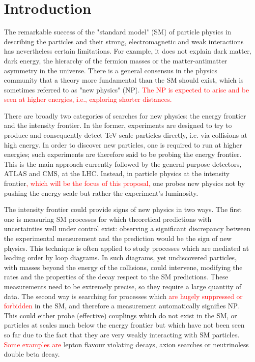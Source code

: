 
\section{Introduction}

The remarkable success of the "standard model" (SM) of particle physics in describing the particles and their strong, electromagnetic and weak interactions has nevertheless certain limitations. For example, it does not explain dark matter, dark energy, the hierarchy of the fermion masses or the matter-antimatter asymmetry in the universe. There is a general consensus in the physics community that a theory more fundamental than the SM should exist, which is sometimes referred to as "new physics" (NP). \textcolor{red}{The NP is expected to arise and be seen at higher energies, i.e., exploring shorter distances.} 

There are broadly two categories of searches for new physics: the energy frontier and the intensity frontier.  In the former, experiments are designed to try to produce and consequently detect TeV-scale particles directly, i.e. via collisions at high energy. In order to discover new particles, one is required to run at higher energies;  such experiments are therefore said to be probing the energy frontier. This is the main approach currently followed by the general purpose detectors, ATLAS and CMS, at the LHC. 
Instead, in particle physics at the intensity frontier\textcolor{red}{, which will be the focus of this proposal,}  one probes new physics not by pushing the energy scale but rather the experiment's luminosity.

The intensity frontier could provide signs of new physics in two ways. The first one is  measuring SM processes for which theoretical predictions with uncertainties well under control  exist:  observing a significant discrepancy between the experimental measurement and the prediction  would be the sign of new physics. This technique is often applied to study processes which are mediated at leading order by loop diagrams. In such diagrams, yet undiscovered particles, with masses beyond the energy of the collisions, could  intervene, modifying the rates and the properties of the decay respect to the SM predictions. These measurements need to be extremely precise, so they require a large quantity of data.  The second way is searching for processes which \textcolor{red}{are hugely suppressed or forbidden } in the SM, and therefore a measurement automatically signifies NP. This could either probe (effective) couplings which do not exist in the SM, or particles at scales much below the energy frontier but which have not  been seen so far due to the fact that they are very weakly interacting with SM particles. \textcolor{red}{Some examples are} lepton flavour violating decays, axion searches or neutrinoless double beta decay.

